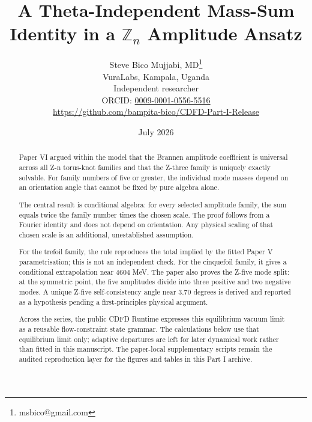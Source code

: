 \documentclass[11pt]{article}
\begin{document}
\title{A Theta-Independent Mass-Sum Identity in a $\mathbb{Z}_n$ Amplitude Ansatz}

\author{Steve Bico Mujjabi, MD\thanks{msbico@gmail.com}\\
VuraLabs, Kampala, Uganda\\
Independent researcher\\
ORCID: \href{https://orcid.org/0009-0001-0556-5516}{0009-0001-0556-5516}\\
\url{https://github.com/bampita-bico/CDFD-Part-I-Release}}

\date{July 2026}

\maketitle

\begin{abstract}
Paper VI argued within the model that the Brannen amplitude coefficient is
universal across all Z-n torus-knot families and that the Z-three family is
uniquely exactly solvable. For family numbers of five or greater, the
individual mode masses depend on an orientation angle that cannot be fixed by
pure algebra alone.

The central result is conditional algebra: for every selected amplitude family,
the sum equals twice the family number times the chosen scale. The proof follows
from a Fourier identity and does not depend on orientation. Any physical scaling
of that chosen scale is an additional, unestablished assumption.

For the trefoil family, the rule reproduces the total implied by the fitted
Paper V parametrisation; this is not an independent check. For the cinquefoil
family, it gives a conditional extrapolation near 4604 MeV. The paper also proves the Z-five mode
split: at the symmetric point, the five amplitudes divide into three positive
and two negative modes. A unique Z-five self-consistency angle near
3.70 degrees is derived and reported as a hypothesis pending a first-principles
physical argument.

Across the series, the public CDFD Runtime expresses this equilibrium vacuum
limit as a reusable flow-constraint state grammar. The calculations below use
that equilibrium limit only; adaptive departures are left for later dynamical
work rather than fitted in this manuscript. The paper-local supplementary
scripts remain the audited reproduction layer for the figures and tables in
this Part I archive.
\end{abstract}
\end{document}
